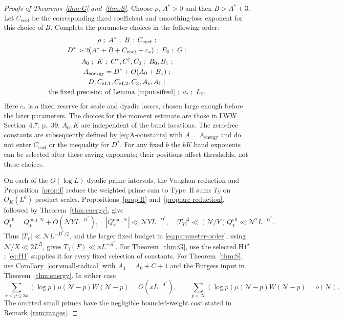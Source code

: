 \documentclass[11pt]{article}
\theoremstyle{definition}
\newcommand{\GN}{\mathcal N}
\newcommand{\QQ}{Q_Y^{\mathrm{all}}}
\newcommand{\Qmaj}{Q_Y^{\mathrm{maj},\GN}}
\theoremstyle{remark}
\numberwithin{equation}{section}
\begin{document}
\begin{proof}[Proofs of Theorems~\ref{thm:G} and~\ref{thm:S}]
Choose $\rho$, $A^*>0$ and then $B>A^*+3$.
Let $C_{\mathrm{coef}}$ be the corresponding fixed coefficient and
smoothing-loss exponent for this choice of $B$.
Complete the parameter choices in the following order:
\begin{equation}\label{eq:parameter-order}
 \begin{gathered}
 \rho\ ;\ A^*\ ;\ B\ ;\ C_{\mathrm{coef}}\ ;\\
 D^*>2(A^*+B+C_{\mathrm{coef}}+c_*)\ ;\ E_0\ ;\ G\ ;\\
 A_0\ ;\ K\ ;\ C^*,C^\dagger,C_0\ ;\ B_0,B_1\ ;\\
 A_{\mathrm{energy}}=D^*+O(A_0+B_1)\ ;\\
 D,C_{\mathrm{zf},1},C_{\mathrm{zf},2},C_3,A_s,A_1\ ;\\
 \text{the fixed precision of Lemma~\ref{input:sifted}}\ ;\ a_i\ ;\ L_0.
 \end{gathered}
\end{equation}
Here $c_*$ is a fixed reserve for scale and dyadic losses, chosen
large enough before the later parameters.
The choices for the moment estimate are those in LWW
Section~4.7, p.~39; $A_0,K$ are independent of the band locations.
The zero-free constants are subsequently defined by
\eqref{eq:A-constants} with $A=A_{\mathrm{energy}}$ and do not
enter $C_{\mathrm{coef}}$ or the inequality for $D^*$.
For any fixed $b$ the $bK$ band exponents can be selected after these
saving exponents; their positions affect thresholds, not these choices.

On each of the $O(\log L)$ dyadic prime intervals, the Vaughan
reduction and Proposition~\ref{prop:I} reduce the weighted prime sum
to Type~II sums $T_Y$ on $O_K(L^\theta)$ product scales.
Propositions~\ref{prop:II} and~\ref{prop:arc-reduction}, followed by
Theorem~\ref{thm:energy}, give
\begin{equation}\label{eq:assembly-square}
 \QQ=\Qmaj+O(\GN YL^{-D^*}),\quad
 |\Qmaj|\ll\GN YL^{-D^*},\quad
 |T_Y|^2\ll(\GN/Y)\QQ\ll\GN^2L^{-D^*}.
\end{equation}
Thus $|T_Y|\ll\GN L^{-D^*/2}$, and the larger fixed budget in
\eqref{eq:parameter-order}, using $\GN/X\ll2L^B$, gives
$T_3(F)\ll xL^{-A^*}$.
For Theorem~\ref{thm:G}, use the selected $\mathrm H1^\star$;
\eqref{eq:H1} supplies it for every fixed selection of constants.
For Theorem~\ref{thm:S}, use Corollary~\ref{cor:small-radical} with
$A_1=A_0+C+1$ and the Burgess input in Theorem~\ref{thm:energy}.
In either case
\begin{equation}\label{eq:weighted-conclusion}
 \sum_{x<p\le2x}(\log p)\mu(\GN-p)W(\GN-p)=O(xL^{-A^*}),
 \qquad
 \sum_{p<\GN}(\log p)\mu(\GN-p)W(\GN-p)=o(\GN).
\end{equation}
The omitted small primes have the negligible bounded-weight cost
stated in Remark~\ref{rem:ranges}.


\end{proof}
\end{document}
